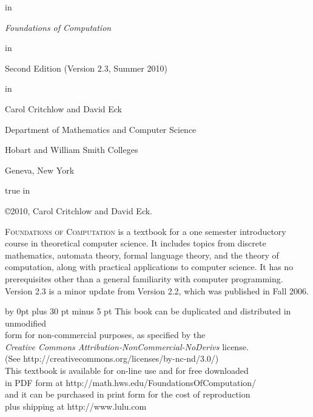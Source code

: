 \documentclass{book}
\theoremstyle{definition}
\newcommand*{\largesize}[1]{{\Large#1}}
\newcommand*{\startchapter}[1]{\textsc{\largesize #1}}  %
\begin{document}
\frontmatter

\begin{titlepage}

 in 
\centerline{\Huge \textit{Foundations of Computation}}
 in
\centerline{Second Edition (Version 2.3, Summer 2010)}
 in
\centerline{\Large Carol Critchlow and David Eck}
\medskip
\centerline{Department of Mathematics and Computer Science}
\smallskip
\centerline{Hobart and William Smith Colleges}
\smallskip
\centerline{Geneva, New York}



\newpage
{} true in

{\narrower\narrower

\noindent \copyright 2010, Carol Critchlow and David Eck.
\bigskip

\noindent \startchapter{Foundations of Computation} is a textbook for a one semester introductory course
in theoretical computer science.  It includes topics from discrete mathematics,
automata theory, formal language theory, and the theory of computation, along with
practical applications to computer science. It has no prerequisites other than a
general familiarity with computer programming.  Version 2.3 is a minor update from Version 2.2,
which was published in Fall 2006.

\bigskip


\small{\advance\rightskip by 0pt plus 30 pt minus 5 pt
\noindent This book can be duplicated and distributed in unmodified\\
form for non-commercial purposes, as specified by the\\
\textit{Creative Commons Attribution-NonCommercial-NoDerivs} license.\\
(See http://creativecommons.org/licenses/by-nc-nd/3.0/)\\[8pt]
This textbook is available for on-line use and for free downloaded\\
in PDF form at http://math.hws.edu/FoundationsOfComputation/ \\
and it can be purchased in print form for the cost of reproduction\\
plus shipping at http://www.lulu.com}


}



\end{titlepage}

\tableofcontents

%
%


\mainmatter

%
%
%
\newcommand{\REOR}{\hbox{$\,|\,$}}

%

\printindex
\end{document}

